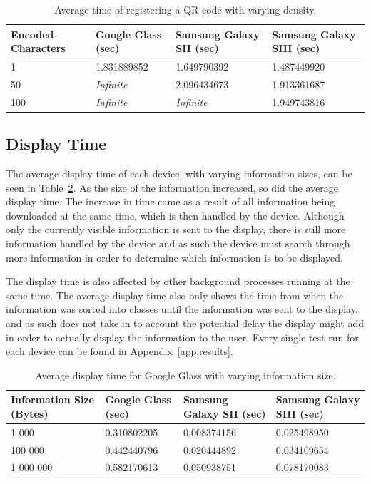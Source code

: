 	\begin{table}[H]%
    		\caption{Average time of registering a QR code with varying density.} \label{tab:complexityAverage}
		\centering \begin{tabularx}{\textwidth}{l|X|X|X} \hline
		\textbf{Encoded Characters} & \textbf{Google Glass (sec)} & \textbf{Samsung Galaxy SII (sec)} & \textbf{Samsung Galaxy SIII (sec)} \\ \hline \hline
       
		1	&1.831889852	&1.649790392	&1.487449920	\\ \hline
		50	&\textit{Infinite}	&2.096434673	&1.913361687	\\ \hline
		100	&\textit{Infinite}	&\textit{Infinite}	&1.949743816	\\ \hline
		
		\end{tabularx}
	\end{table}

\subsection{Display Time}

The average display time of each device, with varying information sizes, can be seen in Table~\ref{tab:averageDisplaySpeedGoogleGlass}. As the size of the information increased, so did the average display time. The increase in time came as a result of all information being downloaded at the same time, which is then handled by the device. Although only the currently visible information is sent to the display, there is still more information handled by the device and as such the device must search through more information in order to determine which information is to be displayed. 

The display time is also affected by other background processes running at the same time. The average display time also only shows the time from when the information was sorted into classes until the information was sent to the display, and as such does not take in to account the potential delay the display might add in order to actually display the information to the user. Every single test run for each device can be found in Appendix~\ref{app:results}.

	\begin{table}[ht!]
    		\caption{Average display time for Google Glass with varying information size.} \label{tab:averageDisplaySpeedGoogleGlass}
		\centering \begin{tabularx}{\textwidth}{l|X|X|X} \hline
		\textbf{Information Size (Bytes)} & \textbf{Google Glass (sec)}  & \textbf{Samsung Galaxy SII (sec)}  & \textbf{Samsung Galaxy SIII (sec)} \\ \hline \hline
       
		1 000	&0.310802205	&0.008374156	&0.025498950	 \\ \hline
		100 000 	&0.442440796	&0.020444892	&0.034109654	 \\ \hline
		1 000 000	&0.582170613	&0.050938751	&0.078170083	 \\ \hline

		\end{tabularx}
	\end{table}

